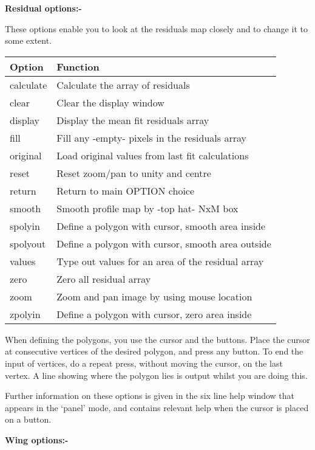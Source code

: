 \begin{small}
{{ 
 {\bf \hspace*{2em} Residual options:-}
 
 These options enable you to look at the residuals map
 closely and to change it to some extent.
 
 \begin{tabular}{|l|p{4.5in}|}\hline
 Option & Function \\ \hline
 calculate     &  Calculate the array of residuals \\
 clear         &  Clear the display window \\
 display       &  Display the mean fit residuals array \\
 fill          &  Fill any -empty- pixels in the residuals array \\
 original      &  Load original values from last fit calculations \\
 reset         &  Reset zoom/pan to unity and centre \\
 return        &  Return to main OPTION choice \\
 smooth        &  Smooth profile map by -top hat- NxM box \\
 spolyin       &  Define a polygon with cursor, smooth area inside \\
 spolyout      &  Define a polygon with cursor, smooth area outside \\
 values        &  Type out values for an area of the residual array \\
 zero          &  Zero all residual array \\
 zoom          &  Zoom and pan image by using mouse location \\
 zpolyin       &  Define a polygon with cursor, zero area inside \\
 \hline\end{tabular}
 
 When defining the polygons, you use the cursor and the
 buttons. Place the cursor at consecutive vertices of the
 desired polygon, and press any button. To end the input of
 vertices, do a repeat press, without moving the cursor, on
 the last vertex. A line showing where the polygon lies is
 output whilst you are doing this.
 
 Further information on these options is given in the six line help
 window that appears in the `panel' mode, and contains relevant help
 when the cursor is placed on a button.
 
 {\bf \hspace*{2em} Wing options:-}
 
}}
\end{small}
